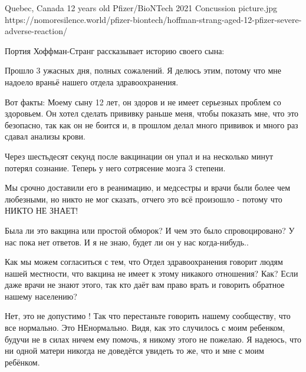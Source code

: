 {Quebec, Canada}
{12 years old}
{Pfizer/BioNTech}
{2021}
{Concussion}
{picture.jpg}
{https://nomoresilence.world/pfizer-biontech/hoffman-strang-aged-12-pfizer-severe-adverse-reaction/}
{

Портия Хоффман-Странг рассказывает историю своего сына:

Прошло 3 ужасных дня, полных сожалений. Я делюсь этим, потому что мне надоело
враньё нашего отдела здравоохранения.

Вот факты: Моему сыну 12 лет, он здоров и не имеет серьезных проблем со
здоровьем. Он хотел сделать прививку раньше меня, чтобы показать мне, что это
безопасно, так как он не боится и, в прошлом делал много прививок и много раз
сдавал анализы крови.

Через шестьдесят секунд после вакцинации он упал и на несколько минут потерял
сознание. Теперь у него сотрясение мозга 3 степени.

Мы срочно доставили его в реанимацию, и медсестры и врачи были более чем
любезными, но никто не мог сказать, отчего это всё произошло - потому что НИКТО
НЕ ЗНАЕТ!

Была ли это вакцина или простой обморок? И чем это было спровоцировано? У нас
пока нет ответов. И я не знаю, будет ли он у нас когда-нибудь..

Как мы можем согласиться с тем, что Отдел здравоохранения говорит людям нашей
местности, что вакцина не имеет к этому никакого отношения? Как? Если даже врачи
не знают этого, так кто даёт вам право врать и говорить обратное нашему
населению?

Нет, это не допустимо ! Так что перестаньте говорить нашему сообществу, что все
нормально. Это НЕнормально. Видя, как это случилось с моим ребенком, будучи не в
силах ничем ему помочь, я никому этого не пожелаю. Я надеюсь, что ни одной
матери никогда не доведётся увидеть то же, что и мне с моим ребёнком.

}
